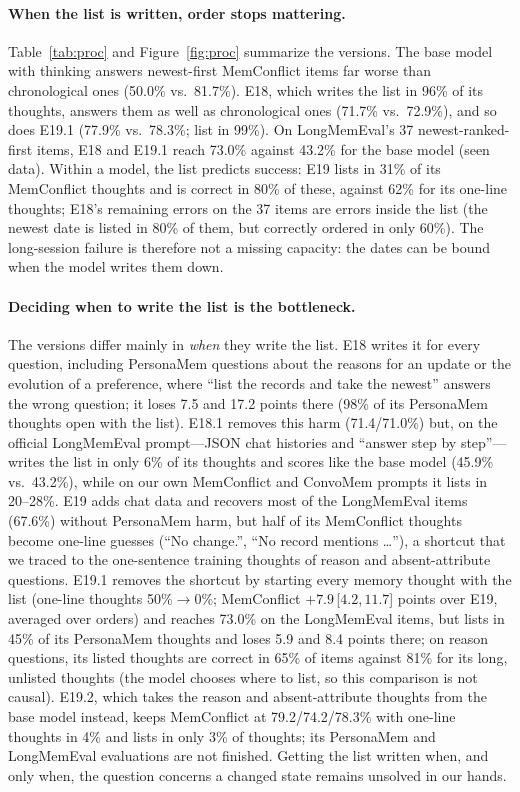 \documentclass[11pt]{article}
\newcommand{\ci}[2]{\,[$#1$,\,$#2$]}
\begin{document}
\paragraph{When the list is written, order stops mattering.}
Table~\ref{tab:proc} and Figure~\ref{fig:proc} summarize the versions. The base model with thinking answers newest-first MemConflict items far worse than chronological ones (50.0\% vs.\ 81.7\%). E18, which writes the list in 96\% of its thoughts, answers them as well as chronological ones (71.7\% vs.\ 72.9\%), and so does E19.1 (77.9\% vs.\ 78.3\%; list in 99\%). On LongMemEval's 37 newest-ranked-first items, E18 and E19.1 reach 73.0\% against 43.2\% for the base model (seen data). Within a model, the list predicts success: E19 lists in 31\% of its MemConflict thoughts and is correct in 80\% of these, against 62\% for its one-line thoughts; E18's remaining errors on the 37 items are errors inside the list (the newest date is listed in 80\% of them, but correctly ordered in only 60\%). The long-session failure is therefore not a missing capacity: the dates can be bound when the model writes them down.

\paragraph{Deciding when to write the list is the bottleneck.}
The versions differ mainly in \emph{when} they write the list. E18 writes it for every question, including PersonaMem questions about the reasons for an update or the evolution of a preference, where ``list the records and take the newest'' answers the wrong question; it loses 7.5 and 17.2 points there (98\% of its PersonaMem thoughts open with the list). E18.1 removes this harm (71.4/71.0\%) but, on the official LongMemEval prompt---JSON chat histories and ``answer step by step''---writes the list in only 6\% of its thoughts and scores like the base model (45.9\% vs.\ 43.2\%), while on our own MemConflict and ConvoMem prompts it lists in 20--28\%. E19 adds chat data and recovers most of the LongMemEval items (67.6\%) without PersonaMem harm, but half of its MemConflict thoughts become one-line guesses (``No change.'', ``No record mentions \ldots''), a shortcut that we traced to the one-sentence training thoughts of reason and absent-attribute questions. E19.1 removes the shortcut by starting every memory thought with the list (one-line thoughts 50\%$\rightarrow$0\%; MemConflict $+7.9$\ci{4.2}{11.7} points over E19, averaged over orders) and reaches 73.0\% on the LongMemEval items, but lists in 45\% of its PersonaMem thoughts and loses 5.9 and 8.4 points there; on reason questions, its listed thoughts are correct in 65\% of items against 81\% for its long, unlisted thoughts (the model chooses where to list, so this comparison is not causal). E19.2, which takes the reason and absent-attribute thoughts from the base model instead, keeps MemConflict at 79.2/74.2/78.3\% with one-line thoughts in 4\% and lists in only 3\% of thoughts; its PersonaMem and LongMemEval evaluations are not finished. Getting the list written when, and only when, the question concerns a changed state remains unsolved in our hands.
\end{document}
